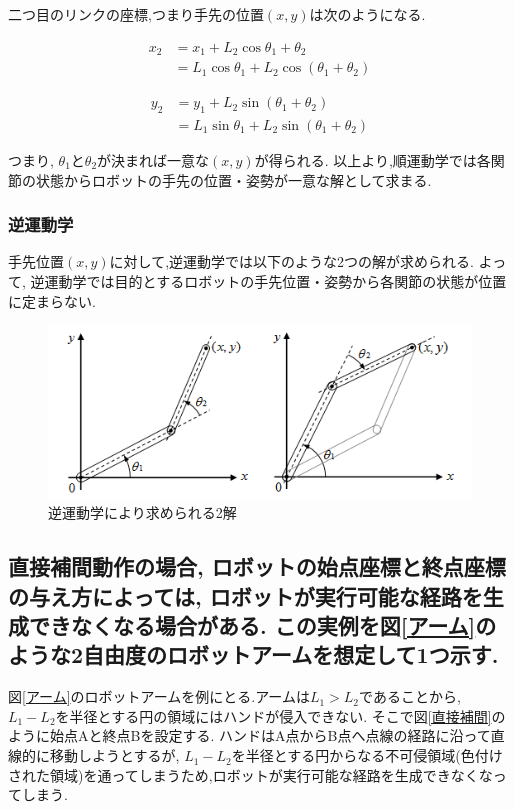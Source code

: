 \documentclass[a4paper,11pt]{jsarticle}
\begin{document}
二つ目のリンクの座標,つまり手先の位置$(x,y)$は次のようになる.

\begin{align}
  x_2&=x_1+L_2\cos{\theta_1 + \theta_2 }\\
     &=L_1\cos\theta_1+L_2\cos\left(\theta_1+\theta_2\right)
\end{align}

\begin{align}
  y_2&=y_1+L_2\sin\left(\theta_1+\theta_2\right)\\
     &=L_1\sin\theta_1+L_2\sin\left(\theta_1+\theta_2\right)
\end{align}

つまり, $\theta_1$と$\theta_2$が決まれば一意な$(x,y)$が得られる.
以上より,順運動学では各関節の状態からロボットの手先の位置・姿勢が一意な解として求まる.

\subsubsection{逆運動学}
手先位置$(x,y)$に対して,逆運動学では以下のような2つの解が求められる.
よって, 逆運動学では目的とするロボットの手先位置・姿勢から各関節の状態が位置に定まらない.
\begin{figure}[H]
  \includegraphics{画像/逆運動学.png}
  \caption{逆運動学により求められる2解}
  \label{逆運動学}
\end{figure}




\subsection{直接補間動作の場合, ロボットの始点座標と終点座標の与え方によっては,
ロボットが実行可能な経路を生成できなくなる場合がある. この実例を図\ref{アーム}のような2自由度のロボットアームを想定して1つ示す.}
図\ref{アーム}のロボットアームを例にとる.アームは$L_1>L_2$であることから, $L_1-L_2$を半径とする円の領域にはハンドが侵入できない.
そこで図\ref{直接補間}のように始点Aと終点Bを設定する. ハンドはA点からB点へ点線の経路に沿って直線的に移動しようとするが,
$L_1-L_2$を半径とする円からなる不可侵領域(色付けされた領域)を通ってしまうため,ロボットが実行可能な経路を生成できなくなってしまう.
\end{document}
